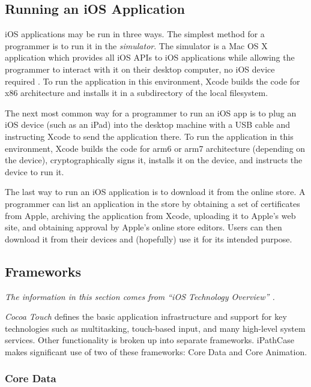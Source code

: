 \subsection{Running an iOS Application}

iOS applications may be run in three ways. The simplest method for a programmer
is to run it in the \emph{simulator}. The simulator is a Mac OS X application
which provides all iOS APIs to iOS applications while allowing the programmer to
interact with it on their desktop computer, no iOS device required
\cite{ios:application-programming-guide}. To run the application in this
environment, Xcode builds the code for x86 architecture and installs it in a
subdirectory of the local filesystem.

The next most common way for a programmer to run an iOS app is to plug an iOS
device (such as an iPad) into the desktop machine with a USB cable and
instructing Xcode to send the application there. To run the application in this
environment, Xcode builds the code for arm6 or arm7 architecture (depending on
the device), cryptographically signs it, installs it on the device, and
instructs the device to run it.

The last way to run an iOS application is to download it from the online store.
A programmer can list an application in the store by obtaining a set of
certificates from Apple, archiving the application from Xcode, uploading it to
Apple's web site, and obtaining approval by Apple's online store editors. Users
can then download it from their devices and (hopefully) use it for its intended
purpose.

\subsection{Frameworks}

\emph{The information in this section comes from ``iOS Technology Overview''
\cite{ios:overview}.}

\emph{Cocoa Touch} defines the basic application infrastructure and support for
key technologies such as multitasking, touch-based input, and many high-level
system services. Other functionality is broken up into separate frameworks.
iPathCase makes significant use of two of these frameworks: Core Data and Core
Animation.

\subsubsection{Core Data}
\label{sect:core_data}

